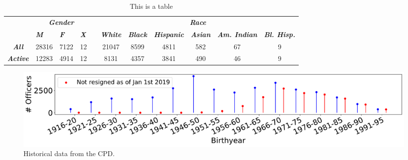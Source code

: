 \begin{table}[h]
\begin{tabular}{l|c|c|c|l|c|c|c|c|c|c|}
\cline{2-4} \cline{6-11}
                                                       & \multicolumn{3}{c|}{\textit{\textbf{Gender}}}                                                                                  &                       & \multicolumn{6}{c|}{\textit{\textbf{Race}}}                                                                                                                                                                                                                                                           \\ \cline{2-4} \cline{6-11} 
                                                       & \multicolumn{1}{l|}{\textit{\textbf{M}}} & \multicolumn{1}{l|}{\textit{\textbf{F}}} & \multicolumn{1}{l|}{\textit{\textbf{X}}} &                       & \multicolumn{1}{l|}{\textit{\textbf{White}}} & \multicolumn{1}{l|}{\textit{\textbf{Black}}} & \multicolumn{1}{l|}{\textit{\textbf{Hispanic}}} & \multicolumn{1}{l|}{\textit{\textbf{Asian}}} & \multicolumn{1}{l|}{\textit{\textbf{Am. Indian}}} & \multicolumn{1}{l|}{\textit{\textbf{Bl. Hisp.}}} \\ \cline{1-4} \cline{6-11} 
\multicolumn{1}{|c|}{\textit{\textbf{All}}}            & 28316                                    & 7122                                     & 12                                       & \multicolumn{1}{c|}{} & 21047                                        & 8599                                         & 4811                                            & 582                                          & 67                                                & 9                                                  \\ \cline{1-4} \cline{6-11} 
\multicolumn{1}{|c|}{\textit{\textbf{Active}}} & 12283                                    & 4914                                     & 12                                       & \multicolumn{1}{c|}{} & 8131                                         & 4357                                         & 3841                                            & 490                                          & 46                                                & 9                                                  \\ \cline{1-4} \cline{6-11} 
\end{tabular}
\caption{This is a table} \label{tab:stats}
\end{table}

\begin{figure}[h] 
	\includegraphics[width=\textwidth]{figs/history_by} 
	\caption{Historical data from the CPD. } \label{fig:history_by}
\end{figure}